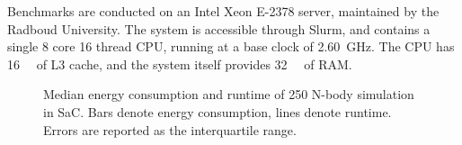 \documentclass[runningheads]{llncs}
\begin{document}
Benchmarks are conducted on an Intel Xeon E-2378 server, maintained by the Radboud University.
The system is accessible through Slurm, and contains a single 8 core 16 thread CPU, running at a base clock of \qty{2.60}{\giga\hertz}.
The CPU has \qty{16}{\mega\byte} of L3 cache, and the system itself provides \qty{32}{\giga\byte} of RAM.

\begin{figure}[!t]
  \centering
  \tiny
  \begin{subfigure}{.333\linewidth}
  \end{subfigure}%
  \begin{subfigure}{.333\linewidth}
  \end{subfigure}%
  \begin{subfigure}{.333\linewidth}
  \end{subfigure}%
  \caption{Median energy consumption and runtime of 250 N-body simulation in SaC.
  Bars denote energy consumption, lines denote runtime.
  Errors are reported as the interquartile range.}%
  \label{fig:nbody}
\end{figure}
\end{document}
